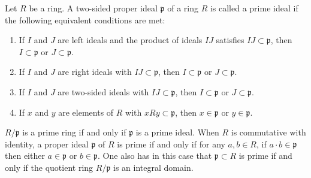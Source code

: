 \documentclass[12pt]{article}
\begin{document}
Let $R$ be a ring. A two-sided proper ideal $\mathfrak{p}$ of a ring $R$ is called a prime ideal if the following equivalent conditions are met:

\begin{enumerate}
\item If $I$ and $J$ are left ideals and the product of ideals $IJ$ satisfies $IJ \subset \mathfrak{p}$, then $I \subset \mathfrak{p}$ or $J \subset \mathfrak{p}$.
\item If $I$ and $J$ are right ideals with $IJ \subset \mathfrak{p}$, then $I \subset \mathfrak{p}$ or $J \subset \mathfrak{p}$.
\item If $I$ and $J$ are two-sided ideals with $IJ \subset \mathfrak{p}$, then $I \subset \mathfrak{p}$ or $J\subset \mathfrak{p}$.
\item If $x$ and $y$ are elements of $R$ with $xRy \subset \mathfrak{p}$, then $x \in \mathfrak{p}$ or $y \in \mathfrak{p}$.
\end{enumerate}

$R/\mathfrak{p}$ is a prime ring if and only if $\mathfrak{p}$ is a prime ideal. When $R$ is commutative with identity, a proper ideal $\mathfrak{p}$ of $R$ is prime if and only if for any $a,b \in R$, if $a\cdot b \in \mathfrak{p}$ then either $a \in \mathfrak{p}$ or $b \in \mathfrak{p}$. One also has in this case that $\mathfrak{p} \subset R$ is prime if and only if the quotient ring $R/\mathfrak{p}$ is an integral domain.
\end{document}
